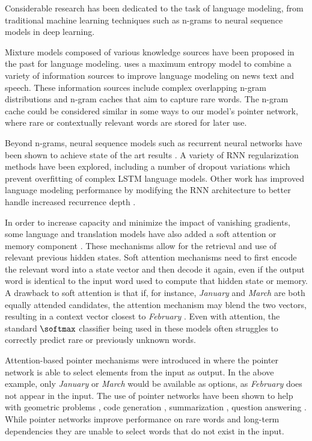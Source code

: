 Considerable research has been dedicated to the task of language modeling, from traditional machine learning techniques such as n-grams to neural sequence models in deep learning.

Mixture models composed of various knowledge sources have been proposed in the past for language modeling.
\citet{Rosenfeld1996} uses a maximum entropy model to combine a variety of information sources to improve language modeling on news text and speech. These information sources include complex overlapping n-gram distributions and n-gram caches that aim to capture rare words. The n-gram cache could be considered similar in some ways to our model's pointer network, where rare or contextually relevant words are stored for later use.

Beyond n-grams, neural sequence models such as recurrent neural networks have been shown to achieve state of the art results \cite{Mikolov2010}. A variety of RNN regularization methods have been explored, including a number of dropout variations \cite{Zaremba2014, Gal2015} which prevent overfitting of complex LSTM language models. Other work has improved language modeling performance by modifying the RNN architecture to better handle increased recurrence depth \cite{Zilly2016}.

In order to increase capacity and minimize the impact of vanishing gradients, some language and translation models have also added a soft attention or memory component \cite{Bahdanau2015, Sukhbaatar2015, Cheng2016, Kumar2016, Xiong2016, Ahn2016}. These mechanisms allow for the retrieval and use of relevant previous hidden states. Soft attention mechanisms need to first encode the relevant word into a state vector and then decode it again, even if the output word is identical to the input word used to compute that hidden state or memory. A drawback to soft attention is that if, for instance, \emph{January} and \emph{March} are both equally attended candidates, the attention mechanism may blend the two vectors, resulting in a context vector closest to \emph{February} \cite{Kadlec2016}. Even with attention, the standard $\softmax$ classifier being used in these models often struggles to correctly predict rare or previously unknown words.

Attention-based pointer mechanisms were introduced in \citet{Vinyals2015} where the pointer network is able to select elements from the input as output. In the above example, only \emph{January} or \emph{March} would be available as options, as \emph{February} does not appear in the input. The use of pointer networks have been shown to help with geometric problems \cite{Vinyals2015}, code generation \cite{Ling2016}, summarization \cite{Gu2016, Gulcehre2016}, question answering \cite{Kadlec2016}. While pointer networks improve performance on rare words and long-term dependencies they are unable to select words that do not exist in the input. 

